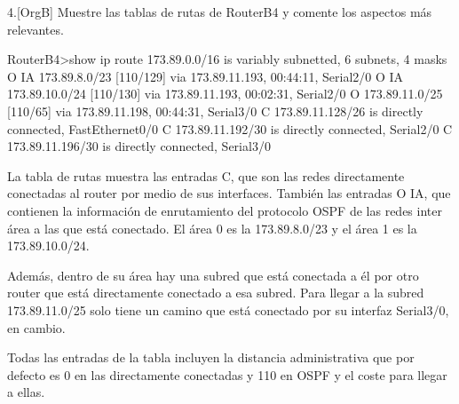 \begin{ejer}
4.[OrgB] Muestre las tablas de rutas de RouterB4 y comente los aspectos más relevantes.
\end{ejer}

\begin{listing}[style=consola]
RouterB4>show ip route
     173.89.0.0/16 is variably subnetted, 6 subnets, 4 masks
O IA    173.89.8.0/23 [110/129] via 173.89.11.193, 00:44:11, Serial2/0
O IA    173.89.10.0/24 [110/130] via 173.89.11.193, 00:02:31, Serial2/0
O       173.89.11.0/25 [110/65] via 173.89.11.198, 00:44:31, Serial3/0
C       173.89.11.128/26 is directly connected, FastEthernet0/0
C       173.89.11.192/30 is directly connected, Serial2/0
C       173.89.11.196/30 is directly connected, Serial3/0
\end{listing}
\par La tabla de rutas muestra las entradas C, que son las redes directamente conectadas al router por medio de sus interfaces. También las entradas O IA, que contienen la información de enrutamiento del protocolo OSPF de las redes inter área a las que está conectado. El área 0 es la 173.89.8.0/23 y el área 1 es la 173.89.10.0/24.
\par Además, dentro de su área hay una subred que está conectada a él por otro router que está directamente conectado a esa subred. Para llegar a la subred 173.89.11.0/25 solo tiene un camino que está conectado por su interfaz Serial3/0, en cambio.
\par Todas las entradas de la tabla incluyen la distancia administrativa que por defecto es 0 en las directamente conectadas y 110 en OSPF y el coste para llegar a ellas.

